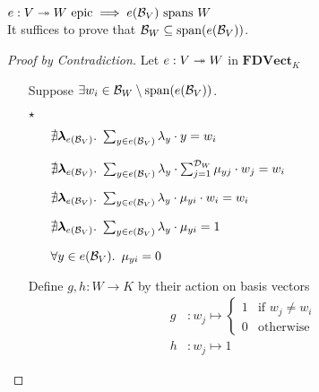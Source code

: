 \begin{lemma}\label{lemma:linear-map-epic-span}
  $e : V\twoheadrightarrow W \text{ epic} \implies e(\mathcal{B}_{V}) \text{ spans } W$\\[1em]
  It suffices to prove that $\mathcal{B}_{W} \subseteq \operatorname{span}(e(\mathcal{B}_{V}))$.

  \begin{proof}[Proof by Contradiction]
    Let $e : V \twoheadrightarrow W$ in $\mathbf{FDVect}_K$
    \begin{itemize}
      \item[\phantom{\imps}]
        Suppose ${\exists w_i\in\mathcal{B}_{W}\setminus\operatorname{span}(e(\mathcal{B}_{V}))}$.
        \marginnote{\Hyp}

      \item[$\star$]
        \begin{itemize}
          \item[\phantom{\imps}]
            $\nexists \boldsymbol{\lambda}_{e(\mathcal{B}_{V})}\ldotp~\sum_{y\in e(\mathcal{B}_{V})} \lambda_y\cdot y = w_i$

          \item[\iffs]
            $\nexists \boldsymbol{\lambda}_{e(\mathcal{B}_{V})}\ldotp~\sum_{y\in e(\mathcal{B}_{V})} \lambda_y\cdot\sum_{j=1}^{\mathcal{D}_{W}}\mu_{yj}\cdot w_j = w_i$

          \item[\iffs]
            $\nexists \boldsymbol{\lambda}_{e(\mathcal{B}_{V})}\ldotp~\sum_{y\in e(\mathcal{B}_{V})} \lambda_y\cdot\mu_{yi}\cdot w_i = w_i$

          \item[\iffs]
            $\nexists \boldsymbol{\lambda}_{e(\mathcal{B}_{V})}\ldotp~\sum_{y\in e(\mathcal{B}_{V})} \lambda_y\cdot\mu_{yi} = 1$

          \item[\iffs]
            $\forall y \in e(\mathcal{B}_{V})\ldotp~\mu_{yi} = 0$
        \end{itemize}


      \item[\phantom{\imps}]
        Define $g, h : W\to K$ by their action on basis vectors
        \begin{align*}
          g & : w_j \mapsto
          \begin{cases}
            1 & \text{if }w_j \neq w_i\\
            0 & \text{otherwise}
          \end{cases}\\
          h & : w_j \mapsto 1
        \end{align*}


\end{itemize}
\end{proof}
\end{lemma}

